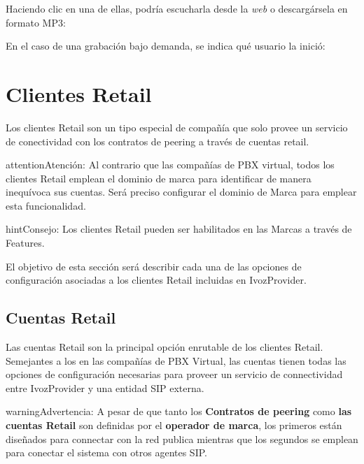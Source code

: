 \documentclass[letterpaper,10pt,spanish]{sphinxmanual}
\begin{document}
\noindent{}

Haciendo clic en una de ellas, podría escucharla desde la \emph{web} o descargársela en formato MP3:

\noindent{}

En el caso de una grabación bajo demanda, se indica qué usuario la inició:

\noindent{}


\chapter{Clientes Retail}
\label{retail/index:retail-clients}\label{retail/index::doc}
Los clientes Retail son un tipo especial de compañía que solo provee un servicio de conectividad con los contratos de peering a través de cuentas retail.

\begin{notice}{attention}{Atención:}
Al contrario que las compañías de PBX virtual, todos los clientes Retail emplean el dominio de marca para identificar de manera inequívoca sus cuentas. Será preciso configurar el dominio de Marca para emplear esta funcionalidad.
\end{notice}

\begin{notice}{hint}{Consejo:}
Los clientes Retail pueden ser habilitados en las Marcas a través de Features.
\end{notice}

El objetivo de esta sección será describir cada una de las opciones de configuración asociadas a los clientes Retail incluidas en IvozProvider.


\section{Cuentas Retail}
\label{retail/retail_accounts::doc}\label{retail/retail_accounts:retail-accounts}\label{retail/retail_accounts:id1}
Las cuentas Retail son la principal opción enrutable de los clientes Retail. Semejantes a los {\hyperref[pbx_features/friends:friends]{}} en las compañías de PBX Virtual, las cuentas tienen todas las opciones de configuración necesarias para proveer un servicio de connectividad entre IvozProvider y una entidad SIP externa.

\begin{notice}{warning}{Advertencia:}
A pesar de que tanto los \textbf{Contratos de peering} como \textbf{las cuentas Retail} son definidas por el \textbf{operador de marca}, los primeros están diseñados para connectar con la red publica mientras que los segundos se emplean para conectar el sistema con otros agentes SIP.
\end{notice}
\end{document}
